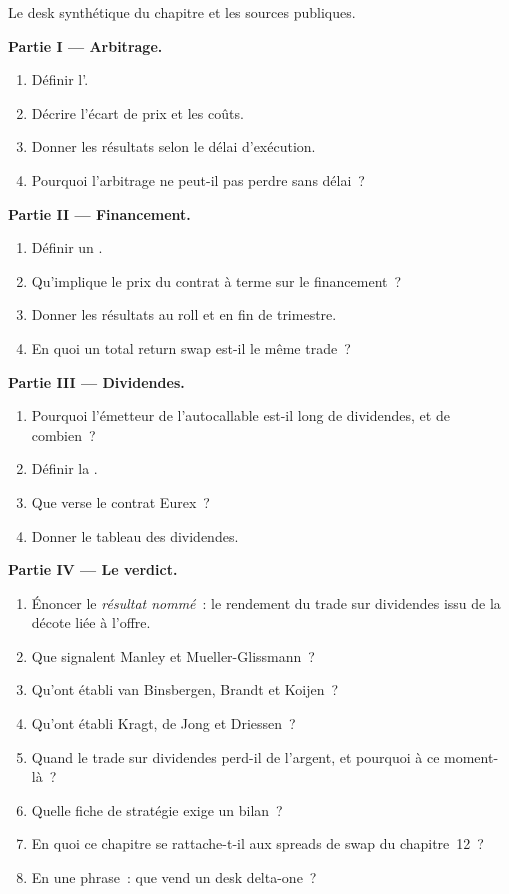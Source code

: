 \begin{problem}\label{pb:s2:delta-one-and-dividends:1}
Le desk synthétique du chapitre et les sources publiques.

\medskip\noindent\textbf{Partie I --- Arbitrage.}
\begin{enumerate}
\item Définir l'.
\item Décrire l'écart de prix et les coûts.
\item Donner les résultats selon le délai d'exécution.
\item Pourquoi l'arbitrage ne peut-il pas perdre sans délai~?
\end{enumerate}

\medskip\noindent\textbf{Partie II --- Financement.}
\begin{enumerate}[resume]
\item Définir un .
\item Qu'implique le prix du contrat à terme sur le financement~?
\item Donner les résultats au roll et en fin de trimestre.
\item En quoi un total return swap est-il le même trade~?
\end{enumerate}

\medskip\noindent\textbf{Partie III --- Dividendes.}
\begin{enumerate}[resume]
\item Pourquoi l'émetteur de l'autocallable est-il long de dividendes, et de combien~?
\item Définir la .
\item Que verse le contrat Eurex~?
\item Donner le tableau des dividendes.
\end{enumerate}

\medskip\noindent\textbf{Partie IV --- Le verdict.}
\begin{enumerate}[resume]
\item Énoncer le \emph{résultat nommé}~: le rendement du trade sur dividendes issu de la décote liée à l'offre.
\item Que signalent Manley et Mueller-Glissmann~?
\item Qu'ont établi van Binsbergen, Brandt et Koijen~?
\item Qu'ont établi Kragt, de Jong et Driessen~?
\item Quand le trade sur dividendes perd-il de l'argent, et pourquoi à ce moment-là~?
\item Quelle fiche de stratégie exige un bilan~?
\item En quoi ce chapitre se rattache-t-il aux spreads de swap du chapitre~12~?
\item En une phrase~: que vend un desk delta-one~?
\end{enumerate}
\end{problem}

